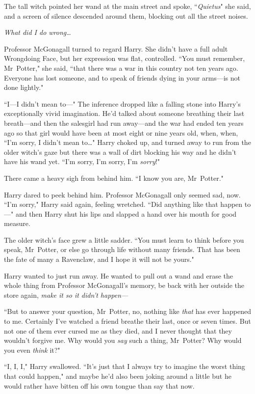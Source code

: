 The tall witch pointed her wand at the main street and spoke, ``\emph{Quietus}" she said, and a screen of silence descended around them, blocking out all the street noises.

\emph{What did I do wrong{\ldots}}

Professor McGonagall turned to regard Harry. She didn't have a full adult Wrongdoing Face, but her expression was flat, controlled. ``You must remember, Mr~Potter," she said, ``that there was a war in this country not ten years ago. Everyone has lost someone, and to speak of friends dying in your arms—is not done lightly."

``I—I didn't mean to—" The inference dropped like a falling stone into Harry's exceptionally vivid imagination. He'd talked about someone breathing their last breath—and then the salesgirl had run away—and the war had ended ten years ago so that girl would have been at most eight or nine years old, when, when, ``I'm sorry, I didn't mean to{\ldots}" Harry choked up, and turned away to run from the older witch's gaze but there was a wall of dirt blocking his way and he didn't have his wand yet. ``I'm sorry, I'm sorry, I'm \emph{sorry}!"

There came a heavy sigh from behind him. ``I know you are, Mr~Potter."

Harry dared to peek behind him. Professor McGonagall only seemed sad, now. ``I'm sorry," Harry said again, feeling wretched. ``Did anything like that happen to—" and then Harry shut his lips and slapped a hand over his mouth for good measure.

The older witch's face grew a little sadder. ``You must learn to think before you speak, Mr~Potter, or else go through life without many friends. That has been the fate of many a Ravenclaw, and I hope it will not be yours."

Harry wanted to just run away. He wanted to pull out a wand and erase the whole thing from Professor McGonagall's memory, be back with her outside the store again, \emph{make it so it didn't happen—}

``But to answer your question, Mr~Potter, no, nothing like \emph{that} has ever happened to me. Certainly I've watched a friend breathe their last, once or seven times. But not one of them ever cursed me as they died, and I never thought that they wouldn't forgive me. Why would you \emph{say} such a thing, Mr~Potter? Why would you even \emph{think} it?"

``I, I, I," Harry swallowed. ``It's just that I always try to imagine the worst thing that could happen," and maybe he'd also been joking around a little but he would rather have bitten off his own tongue than say that now.

